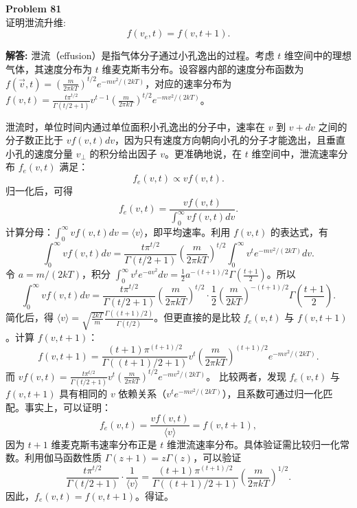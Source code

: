 \documentclass[12pt, a4paper, oneside]{ctexart}
\newenvironment{solution}{\par\noindent\textbf{解答:}\quad}{\par}
\begin{document}
\begin{mdframed}[backgroundcolor=gray!10, linewidth=0pt]
    \textbf{Problem 81} \\
    证明泄流升维:
    \[
    f(v_e, t) = f(v, t+1).
    \]
\end{mdframed}
\begin{solution}
    泄流（effusion）是指气体分子通过小孔逸出的过程。考虑 $t$ 维空间中的理想气体，其速度分布为 $t$ 维麦克斯韦分布。设容器内部的速度分布函数为 $f(\vec{v}, t) = \left( \frac{m}{2\pi kT} \right)^{t/2} e^{-m v^2/(2kT)}$，对应的速率分布为 $f(v, t) = \frac{t \pi^{t/2}}{\Gamma(t/2+1)} v^{t-1} \left( \frac{m}{2\pi kT} \right)^{t/2} e^{-m v^2/(2kT)}$。

    泄流时，单位时间内通过单位面积小孔逸出的分子中，速率在 $v$ 到 $v+dv$ 之间的分子数正比于 $v f(v, t) dv$，因为只有速度方向朝向小孔的分子才能逸出，且垂直小孔的速度分量 $v_\perp$ 的积分给出因子 $v$。更准确地说，在 $t$ 维空间中，泄流速率分布 $f_e(v, t)$ 满足：
    \[
    f_e(v, t) \propto v f(v, t).
    \]
    归一化后，可得
    \[
    f_e(v, t) = \frac{v f(v, t)}{\int_0^\infty v f(v, t) dv}.
    \]
    计算分母：$\int_0^\infty v f(v, t) dv = \langle v \rangle$，即平均速率。利用 $f(v, t)$ 的表达式，有
    \[
    \int_0^\infty v f(v, t) dv = \frac{t \pi^{t/2}}{\Gamma(t/2+1)} \left( \frac{m}{2\pi kT} \right)^{t/2} \int_0^\infty v^t e^{-m v^2/(2kT)} dv.
    \]
    令 $a = m/(2kT)$，积分 $\int_0^\infty v^t e^{-a v^2} dv = \frac{1}{2} a^{-(t+1)/2} \Gamma\left(\frac{t+1}{2}\right)$。所以
    \[
    \int_0^\infty v f(v, t) dv = \frac{t \pi^{t/2}}{\Gamma(t/2+1)} \left( \frac{m}{2\pi kT} \right)^{t/2} \cdot \frac{1}{2} \left( \frac{m}{2kT} \right)^{-(t+1)/2} \Gamma\left(\frac{t+1}{2}\right).
    \]
    简化后，得 $\langle v \rangle = \sqrt{\frac{2kT}{m}} \frac{\Gamma((t+1)/2)}{\Gamma(t/2)}$。但更直接的是比较 $f_e(v, t)$ 与 $f(v, t+1)$。计算 $f(v, t+1)$：
    \[
    f(v, t+1) = \frac{(t+1) \pi^{(t+1)/2}}{\Gamma((t+1)/2+1)} v^t \left( \frac{m}{2\pi kT} \right)^{(t+1)/2} e^{-m v^2/(2kT)}.
    \]
    而 $v f(v, t) = \frac{t \pi^{t/2}}{\Gamma(t/2+1)} v^t \left( \frac{m}{2\pi kT} \right)^{t/2} e^{-m v^2/(2kT)}$。
    比较两者，发现 $f_e(v, t)$ 与 $f(v, t+1)$ 具有相同的 $v$ 依赖关系（$v^t e^{-m v^2/(2kT)}$），且系数可通过归一化匹配。事实上，可以证明：
    \[
    f_e(v, t) = \frac{v f(v, t)}{\langle v \rangle} = f(v, t+1),
    \]
    因为 $t+1$ 维麦克斯韦速率分布正是 $t$ 维泄流速率分布。具体验证需比较归一化常数。利用伽马函数性质 $\Gamma(z+1)=z\Gamma(z)$，可以验证
    \[
    \frac{t \pi^{t/2}}{\Gamma(t/2+1)} \cdot \frac{1}{\langle v \rangle} = \frac{(t+1) \pi^{(t+1)/2}}{\Gamma((t+1)/2+1)} \left( \frac{m}{2\pi kT} \right)^{1/2}.
    \]
    因此，$f_e(v, t) = f(v, t+1)$。得证。
\end{solution}
\end{document}
